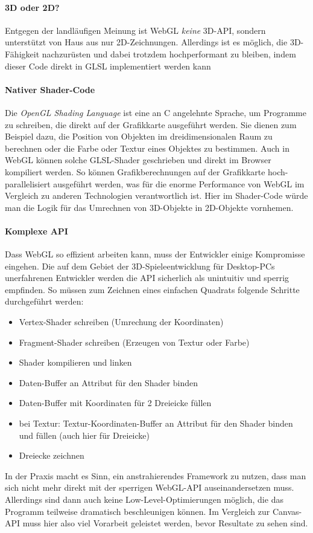 \documentclass[a4paper, 12pt]{article}
\begin{document}
\paragraph{3D oder 2D?} Entgegen der landläufigen Meinung ist WebGL \emph{keine} 3D-API, sondern unterstützt von Haus aus nur 2D-Zeichnungen. Allerdings ist es möglich, die 3D-Fähigkeit nachzurüsten und dabei trotzdem hochperformant zu bleiben, indem dieser Code direkt in GLSL implementiert werden kann
\paragraph{Nativer Shader-Code} Die \emph{OpenGL Shading Language} ist eine an C angelehnte Sprache, um Programme zu schreiben, die direkt auf der Grafikkarte ausgeführt werden. Sie dienen zum Beispiel dazu, die Position von Objekten im dreidimensionalen Raum zu berechnen oder die Farbe oder Textur eines Objektes zu bestimmen. Auch in WebGL können solche GLSL-Shader geschrieben und direkt im Browser kompiliert werden. So können Grafikberechnungen auf der Grafikkarte hoch-parallelisiert ausgeführt werden, was für die enorme Performance von WebGL im Vergleich zu anderen Technologien verantwortlich ist. Hier im Shader-Code würde man die Logik für das Umrechnen von 3D-Objekte in 2D-Objekte vornhemen.\cite{WebGLSpec}
\paragraph{Komplexe API} Dass WebGL so effizient arbeiten kann, muss der Entwickler einige Kompromisse eingehen. Die auf dem Gebiet der 3D-Spieleentwicklung für Desktop-PCs unerfahrenen Entwickler werden die API sicherlich als unintuitiv und sperrig empfinden. So müssen zum Zeichnen eines einfachen Quadrats folgende Schritte durchgeführt werden:
\begin{itemize}
	\item Vertex-Shader schreiben (Umrechung der Koordinaten)
	\item Fragment-Shader schreiben (Erzeugen von Textur oder Farbe)
	\item Shader kompilieren und linken
	\item Daten-Buffer an Attribut für den Shader binden
	\item Daten-Buffer mit Koordinaten für 2 Dreieicke füllen
	\item bei Textur: Textur-Koordinaten-Buffer an Attribut für den Shader binden und füllen (auch hier für Dreieicke)
	\item Dreiecke zeichnen
\end{itemize}
In der Praxis macht es Sinn, ein anstrahierendes Framework zu nutzen, dass man sich nicht mehr direkt mit der sperrigen WebGL-API auseinandersetzen muss. Allerdings sind dann auch keine Low-Level-Optimierungen möglich, die das Programm teilweise dramatisch beschleunigen können.\cite{WebGLSpec} \cite{OpenGLSpec}
Im Vergleich zur Canvas-API muss hier also viel Vorarbeit geleistet werden, bevor Resultate zu sehen sind.
\end{document}
